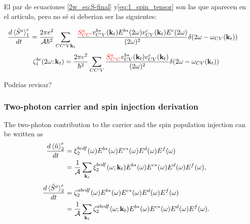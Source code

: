 \documentclass{article}
\newcommand{\kt}{\mathbf{k}_{t}}
\newcommand{\dw}{\delta(2\omega - \omega_{CV}(\kt))}
\begin{document}
{\color{blue} 

El par de  ecuaciones \eqref{2w_eq:S-final}
y\eqref{eq:1_spin_tensor} son las que aparecen en el art\'iculo, pero no s\'e si 
deberian ser las siguientes:

\begin{align*}
\frac{d\ev*{\hat{S}^{a}}^{e}_{1}}{dt} &= 
\frac{2\pi e^{2}}{\mathcal{A}\hbar^{2}} \sum_{CC'V\kt} 
\frac{{\color{red}S^{a}_{CC'}}v^{b*}_{C'V}(\kt)E^{b*}(2\omega)v^{c}_{CV}(\kt)E^{c}(2\omega)}
{(2\omega)^{2}}\dw
\end{align*}
\begin{equation*}
\zeta^{bc}_{1}(2\omega;\kt) = \frac{2\pi e^{2}}{\hbar^{2}} 
\sum_{CC'V} \frac{{\color{red}S^{a}_{C'C}}v^{b*}_{CV}(\kt)v^{c}_{CV}(\kt)}{(2\omega)^{2}} 
\dw
\end{equation*}

Podr\'ias revisar?
}

\subsubsection{Two-photon carrier and spin injection derivation}

The two-photon contribution to the carrier and the spin population injection can
be written as
\begin{equation}
\begin{split}
\frac{d\ev*{\hat{n}}^{e}_{2}}{dt} &=
\xi^{bcdf}_{2}(\omega)E^{b*}(\omega)E^{c*}(\omega)E^{d}(\omega)E^{f}(\omega) \\
&= \frac{1}{\mathcal{A}}\sum_{\kt}\xi^{bcdf}_{2}(\omega;\kt) 
E^{b*}(\omega)E^{c*}(\omega)E^{d}(\omega)E^{f}(\omega) ,
\label{eq:1w_carrier_population} 
\end{split}
\end{equation}
\begin{equation}
\begin{split}
\frac{d\ev*{\hat{S}^{a}}^{e}_{2}}{dt} &=
\zeta^{abcdf}_{2}(\omega)E^{b*}(\omega)E^{c*}(\omega)E^{d}(\omega)E^{f}(\omega) \\
&= \frac{1}{\mathcal{A}}\sum_{\kt}\zeta^{abcdf}_{2}(\omega;\kt)
E^{b*}(\omega)E^{c*}(\omega)E^{d}(\omega)E^{f}(\omega) .
\label{eq:1w_spin_population}
\end{split}
\end{equation}
\end{document}
